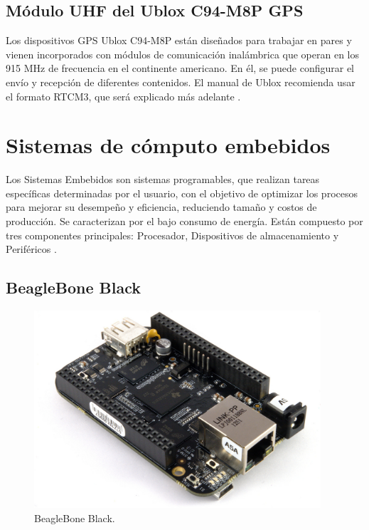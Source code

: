 \subsection{Módulo UHF del Ublox C94-M8P GPS}

Los dispositivos GPS Ublox C94-M8P están diseñados para trabajar en pares y vienen incorporados con módulos de comunicación inalámbrica que operan en los 915 MHz de frecuencia en el continente americano. En él, se puede configurar el envío y recepción de diferentes contenidos. El manual de Ublox recomienda usar el formato RTCM3, que será explicado más adelante \citep{ubloxc94}.

\section{Sistemas de cómputo embebidos}

Los Sistemas Embebidos son sistemas programables, que realizan tareas específicas determinadas por el usuario, con el objetivo de optimizar los procesos para mejorar su desempeño y eficiencia, reduciendo tamaño y costos de producción. Se caracterizan por el bajo consumo de energía. Están compuesto por tres componentes principales: Procesador, Dispositivos de almacenamiento y Periféricos \citep{caballero2014desarrollo}.

\subsection{BeagleBone Black}

\begin{figure}[ht]
\centering
\includegraphics[width=0.95\textwidth]{Figures/BeagleBoneBlack}
\caption[BeagleBone Black.]{BeagleBone Black\footnotemark.}
\label{fig:BBlack}
\end{figure}

